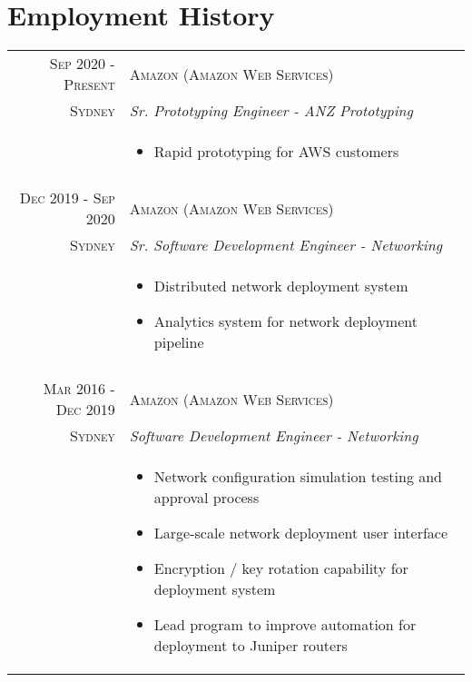 \section*{Employment History}

\begin{tabular}{r|p{11cm}}

\textsc{Sep 2020 - Present} & \textsc{Amazon (Amazon Web Services)}\\
\textsc{Sydney} & \emph{Sr. Prototyping Engineer - ANZ Prototyping}\\
& \begin{footnotesize}
\begin{itemize}
	\vspace*{-\baselineskip}
	\item Rapid prototyping for AWS customers
	\vspace*{-\baselineskip}
\end{itemize}
\end{footnotesize}\\

\multicolumn{2}{c}{} \\

\textsc{Dec 2019 - Sep 2020} & \textsc{Amazon (Amazon Web Services)}\\
\textsc{Sydney} & \emph{Sr. Software Development Engineer - Networking}\\
& \begin{footnotesize}
\begin{itemize}
	\vspace*{-\baselineskip}
	\item Distributed network deployment system
	\item Analytics system for network deployment pipeline
	\vspace*{-\baselineskip}
\end{itemize}
\end{footnotesize}\\

\multicolumn{2}{c}{} \\

\textsc{Mar 2016 - Dec 2019} & \textsc{Amazon (Amazon Web Services)}\\
\textsc{Sydney} & \emph{Software Development Engineer - Networking}\\
& \begin{footnotesize}
\begin{itemize}
	\vspace*{-\baselineskip}
	\item Network configuration simulation testing and approval process
	\item Large-scale network deployment user interface
	\item Encryption / key rotation capability for deployment system
	\item Lead program to improve automation for deployment to Juniper routers
	\vspace*{-\baselineskip}
\end{itemize}
\end{footnotesize}\\


\end{tabular}
